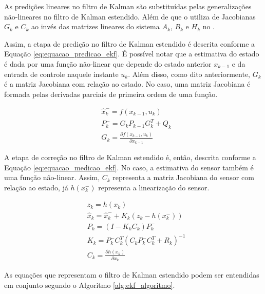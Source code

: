 \documentclass[acronym, symbols, table]{fei}
\begin{document}
			As predições lineares no filtro de Kalman são substituídas pelas generalizações não-lineares no filtro de Kalman estendido. Além de que o  utiliza de Jacobianas $G_k$ e $C_k$ ao invés das matrizes lineares do sistema $A_k$, $B_k$ e $H_k$ no .
			
			Assim, a etapa de predição no filtro de Kalman estendido é descrita conforme a Equação \ref{eq:equacao_predicao_ekf}. É possível notar que a estimativa do estado é dada por uma função não-linear que depende do estado anterior $x_{k-1}$ e da entrada de controle naquele instante $u_{k}$. Além disso, como dito anteriormente, $G_{k}$ é a matriz Jacobiana com relação ao estado. No caso, uma matriz Jacobiana é formada pelas derivadas parciais de primeira ordem de uma função.
			
			\begin{equation} \label{eq:equacao_predicao_ekf}
				\begin{split}
					&\hat{x}_{k}^{-} = f(x_{k-1}, u_{k}) \\
					&P_{k}^{-} = G_{k}P_{k-1}G_{k}^{T} + Q_{k} \\
					&G_{k} = \frac{\partial f(x_{k-1}, u_{k})}{\partial x_{k-1}} 
				\end{split}
			\end{equation}
			
			A etapa de correção no filtro de Kalman estendido é, então, descrita conforme a Equação \ref{eq:equacao_medicao_ekf}. No caso, a estimativa do sensor também é uma função não-linear. Assim, $C_k$ representa a matriz Jacobiana do sensor com relação ao estado, já $h(x_{k}^{-})$ representa a linearização do sensor.
			
			\begin{equation} \label{eq:equacao_medicao_ekf}
				\begin{split}
					&z_k = h(x_{k}) \\
					&\hat{x}_{k} = \hat{x}_{k}^{-} + K_{k}(z_k - h(x_{k}^{-})) \\
					&P_{k} = (I - K_{k}C_{k})P_{k}^{-} \\
					&K_k = P_{k}^{-}C_{k}^T(C_{k}P_{k}^{-}C_{k}^T + R_k)^{-1} \\
					&C_k = \frac{\partial h(x_k)}{\partial x_{k}}
				\end{split}
			\end{equation}
			
			As equações que representam o filtro de Kalman estendido podem ser entendidas em conjunto segundo o Algoritmo \ref{alg:ekf_algoritmo}.
			
\end{document}
